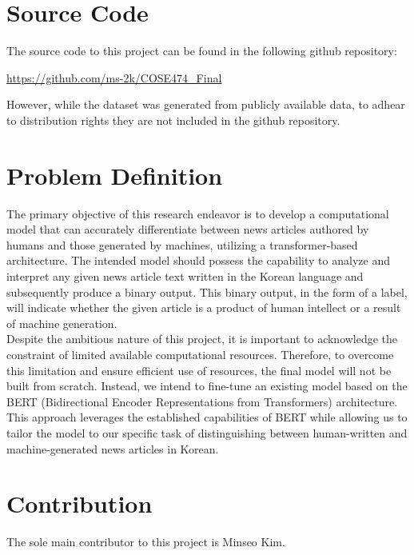 \documentclass{article}
\begin{document}
\section{Source Code}
\null\quad The source code to this project can be found in the following github repository:
\begin{center} \url{https://github.com/ms-2k/COSE474_Final} \end{center}
\null\quad However, while the dataset was generated from publicly available data, to adhear to distribution rights they are not included in the github repository.

\section{Problem Definition}
\null\quad The primary objective of this research endeavor is to develop a computational model that can accurately differentiate between news articles authored by humans and those generated by machines, utilizing a transformer-based architecture.
The intended model should possess the capability to analyze and interpret any given news article text written in the Korean language and subsequently produce a binary output.
This binary output, in the form of a label, will indicate whether the given article is a product of human intellect or a result of machine generation. \\
\null\quad Despite the ambitious nature of this project, it is important to acknowledge the constraint of limited available computational resources.
Therefore, to overcome this limitation and ensure efficient use of resources, the final model will not be built from scratch.
Instead, we intend to fine-tune an existing model based on the BERT (Bidirectional Encoder Representations from Transformers) architecture.
This approach leverages the established capabilities of BERT while allowing us to tailor the model to our specific task of distinguishing between human-written and machine-generated news articles in Korean.

\section{Contribution}
\null\quad The sole main contributor to this project is Minseo Kim.
\end{document}
